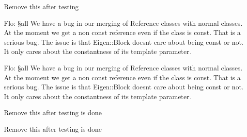 
\begin{DoxyRefList}
\item[\label{bug__bug000001}%
\hypertarget{bug__bug000001}{}%
Member \hyperlink{classow__com_1_1COMEstimator_a784d8b980348a546ae69b17ec27ab1c2}{ow\+\_\+com\+:\+:C\+O\+M\+Estimator\+:\+:update} (const ow\+::\+Cartesian\+State \&X\+\_\+com\+\_\+w, const ow\+::\+Imu\+Sensor \&imu)]Remove this after testing  
\item[\label{bug__bug000002}%
\hypertarget{bug__bug000002}{}%
Member \hyperlink{foot__id_8h_a57e66d30579b22cfe2c17c739278e5a6}{ow\+\_\+core\+:\+:Foot\+Id} ]Flo\+: §all We have a bug in our merging of Reference classes with normal classes. At the moment we get a non const reference even if the class is const. That is a serious bug. The issue is that Eigen\+::\+Block doesn\textquotesingle{}t care about being const or not. It only cares about the constantness of its template parameter.  
\item[\label{bug__bug000003}%
\hypertarget{bug__bug000003}{}%
Class \hyperlink{classow__core_1_1Force}{ow\+\_\+core\+:\+:Force$<$ \+\_\+\+Scalar $>$} ]Flo\+: §all We have a bug in our merging of Reference classes with normal classes. At the moment we get a non const reference even if the class is const. That is a serious bug. The issue is that Eigen\+::\+Block doesn\textquotesingle{}t care about being const or not. It only cares about the constantness of its template parameter.  
\item[\label{bug__bug000004}%
\hypertarget{bug__bug000004}{}%
Member \hyperlink{classow__dcm__planner_1_1DCMPlanner_a0f6bb0ac1fb616cd0c21a8f5e4ae8c7a}{ow\+\_\+dcm\+\_\+planner\+:\+:D\+C\+M\+Planner\+:\+:plan\+D\+C\+M\+Points} (const ow\+::\+Foot\+Step\+List \&footsteps, const ow\+::\+Foot\+Step \&current\+\_\+step)]Remove this after testing is done  
\item[\label{bug__bug000005}%
\hypertarget{bug__bug000005}{}%
Member \hyperlink{classow__dcm__planner_1_1DCMPlanner_aa85207c723117da5c350c33244af2a90}{ow\+\_\+dcm\+\_\+planner\+:\+:D\+C\+M\+Planner\+:\+:print\+Point\+Sets} ()]Remove this after testing is done 
\end{DoxyRefList}